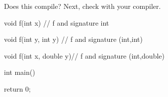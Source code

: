 Does this compile? Next, check with your compiler.



\begin{consolethree}[escapeinside=||]

void f(int x){}          // f and signature int

void f(int y, int y){}   // f and signature (int,int)

void f(int x, double y){}// f and signature (int,double)



int main()

{

    return 0;

}

\end{consolethree}

